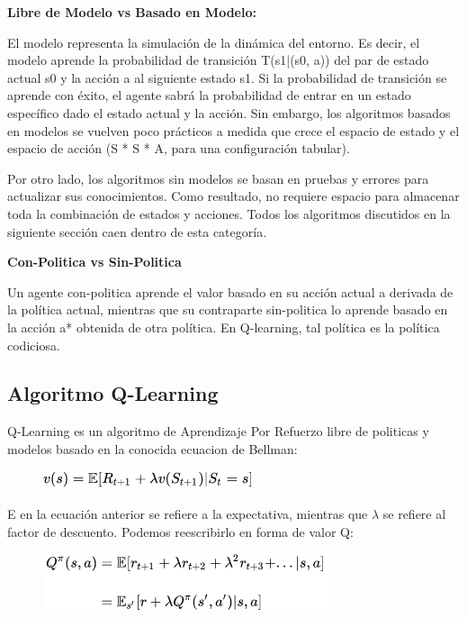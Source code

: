 \textbf{Libre de Modelo vs Basado en Modelo: }

El modelo representa la simulación de la dinámica del entorno. Es decir, el modelo aprende la probabilidad de transición T(s1|(s0, a)) del par de estado actual s0 y la acción a al siguiente estado s1. Si la probabilidad de transición se aprende con éxito, el agente sabrá la probabilidad de entrar en un estado específico dado el estado actual y la acción. Sin embargo, los algoritmos basados en modelos se vuelven poco prácticos a medida que crece el espacio de estado y el espacio de acción (S * S * A, para una configuración tabular).

Por otro lado, los algoritmos sin modelos se basan en pruebas y errores para actualizar sus conocimientos. Como resultado, no requiere espacio para almacenar toda la combinación de estados y acciones. Todos los algoritmos discutidos en la siguiente sección caen dentro de esta categoría.

\textbf{Con-Politica vs Sin-Politica }

Un agente con-politica aprende el valor basado en su acción actual a derivada de la política actual, mientras que su contraparte sin-politica lo aprende basado en la acción a* obtenida de otra política. En Q-learning, tal política es la política codiciosa.

\subsection{Algoritmo Q-Learning}

Q-Learning es un algoritmo de Aprendizaje Por Refuerzo libre de politicas y modelos basado en la conocida ecuacion de Bellman:

\begin{figure}[ht]
	\centering
	\includegraphics[width=0.30\linewidth]{figuras/bellman.png}
	\label{bellman}
\end{figure}

E en la ecuación anterior se refiere a la expectativa, mientras que $\lambda$ se refiere al factor de descuento. Podemos reescribirlo en forma de valor Q:

\begin{figure}[ht]
	\centering
	\includegraphics[width=0.30\linewidth]{figuras/qBellman.png}
	\label{qbellman}
\end{figure}

